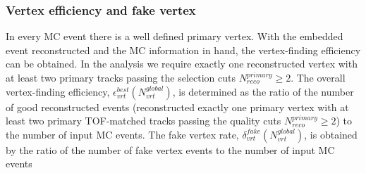 \subsubsection{Vertex efficiency and fake vertex}
In every MC event there is a well defined primary vertex. With the embedded
event reconstructed and the MC information in hand,
the vertex-finding efficiency can be obtained. In the analysis we require exactly one reconstructed vertex with at least two primary tracks passing the selection cuts $N_{reco}^{primary}\geq 2$. The overall
vertex-finding efficiency, $\epsilon_{vrt}^ {best}\left(N_{vrt}^{global}\right)$, is determined as the
ratio of the number of good reconstructed events (reconstructed exactly one primary vertex with at least two primary TOF-matched tracks passing the quality cuts $N_{reco}^{primary}\geq 2$) to the number of input MC events. The fake vertex
rate, $\delta_{vrt}^{fake}\left(N_{vrt}^{global}\right)$, is obtained by the ratio of the number
of fake vertex events to the number of input MC events
